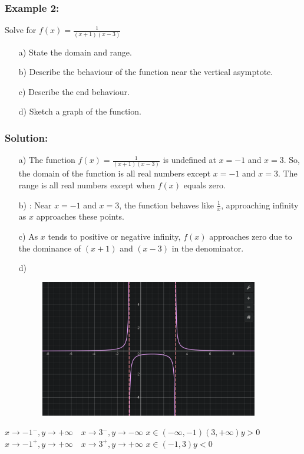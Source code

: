 \documentclass{article}
\begin{document}
\subsubsection*{Example 2:}
Solve for $f(x)=\frac{1}{(x+1)(x-3)}$
\begin{enumerate}
\item[a)] State the domain and range.
\item[b)] Describe the behaviour of the function near the vertical asymptote.
\item[c)] Describe the end behaviour.
\item[d)] Sketch a graph of the function.
\end{enumerate}
\subsubsection*{Solution:}

\begin{enumerate}
    \item[a)] 
    The function \( f(x) = \frac{1}{(x+1)(x-3)} \) is undefined at \( x = -1 \) and \( x = 3 \).     So, the domain of the function is all real numbers except \( x = -1 \) and \( x = 3 \). The range is all real numbers except when \( f(x) \) equals zero.
    
    \item[b)] :
    Near \( x = -1 \) and \( x = 3 \), the function behaves like \( \frac{1}{x} \), approaching infinity as \( x \) approaches these points.
    
    \item[c)] 
    As \( x \) tends to positive or negative infinity, \( f(x) \) approaches zero due to the dominance of \( (x+1) \) and \( (x-3) \) in the denominator.
    \item[d)] 
    \begin{figure}[ht]
    \centering
    \includegraphics[width=0.9\textwidth]{imgs/graph(1_x+1_x-3).png}
    \end{figure}
\end{enumerate}
$x\to -1^-, y\to +\infty \quad x\to 3^-, y\to -\infty$ \quad $x\in(-\infty, -1)(3, +\infty) y >0$ \\
$x\to -1^+, y \to +\infty \quad x\to 3^+, y\to +\infty$ \quad $x\in(-1,3) y< 0$
\end{document}

